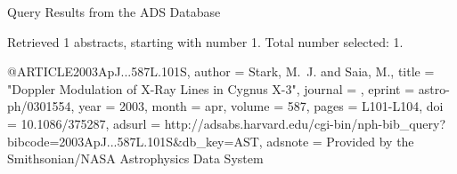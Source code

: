 Query Results from the ADS Database


Retrieved 1 abstracts, starting with number 1.  Total number selected: 1.

@ARTICLE{2003ApJ...587L.101S,
   author = {{Stark}, M.~J. and {Saia}, M.},
    title = "{Doppler Modulation of X-Ray Lines in Cygnus X-3}",
  journal = {\apjl},
   eprint = {astro-ph/0301554},
     year = 2003,
    month = apr,
   volume = 587,
    pages = {L101-L104},
      doi = {10.1086/375287},
   adsurl = {http://adsabs.harvard.edu/cgi-bin/nph-bib_query?bibcode=2003ApJ...587L.101S&db_key=AST},
  adsnote = {Provided by the Smithsonian/NASA Astrophysics Data System}
}


